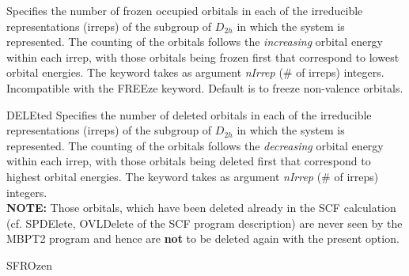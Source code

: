 \begin{keywordlist}
Specifies the number of frozen occupied orbitals in each of the irreducible
representations (irreps) of the subgroup of $D_{2h}$ in which the system
is represented. The counting of the orbitals follows the {\it increasing}
orbital energy within each irrep, with those orbitals being frozen first
that correspond to lowest orbital energies.
The keyword takes as argument {\it nIrrep} (\# of irreps) integers.
Incompatible with the {\keyfont FREEze} keyword.
Default is to freeze non-valence orbitals.
\item[DELEted]
Specifies the number of deleted orbitals in each of the irreducible
representations (irreps) of the subgroup of $D_{2h}$ in which the system
is represented. The counting of the orbitals follows the {\it decreasing}
orbital energy within each irrep, with those orbitals being deleted first
that correspond to highest orbital energies.
The keyword takes as argument {\it nIrrep} (\# of irreps) integers. \\
{\bf NOTE:} Those orbitals, which have been deleted already in the
{\prgmfont SCF} calculation (cf. {\keyfont SPDElete}, {\keyfont OVLDelete} of
the {\prgmfont SCF} program description) are never seen by the
{\prgmfont MBPT2} program and hence are {\bf not} to be deleted again with
the present option.
\item[SFROzen]

\end{keywordlist}
